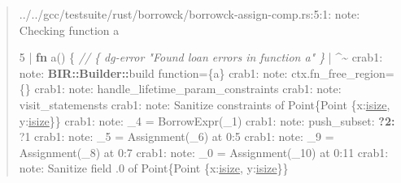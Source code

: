 \documentclass[
  11pt,
  twoside,symmetric]{report}
\newenvironment{Shaded}{}{}
\newcommand{\CharTok}[1]{#1}
\newcommand{\CommentTok}[1]{\textit{#1}}
\newcommand{\DataTypeTok}[1]{\underline{#1}}
\newcommand{\DecValTok}[1]{#1}
\newcommand{\ErrorTok}[1]{\textbf{#1}}
\newcommand{\KeywordTok}[1]{\textbf{#1}}
\newcommand{\NormalTok}[1]{#1}
\newcommand{\OperatorTok}[1]{#1}
\newcommand{\PreprocessorTok}[1]{\textbf{#1}}
\begin{document}
\begin{quote}
\begin{Shaded}
\begin{Highlighting}[]
\OperatorTok{../../}\NormalTok{gcc}\OperatorTok{/}\NormalTok{testsuite}\OperatorTok{/}\NormalTok{rust}\OperatorTok{/}\NormalTok{borrowck}\OperatorTok{/}\NormalTok{borrowck}\OperatorTok{{-}}\NormalTok{assign}\OperatorTok{{-}}\NormalTok{comp}\OperatorTok{.}\NormalTok{rs}\OperatorTok{:}\DecValTok{5}\OperatorTok{:}\DecValTok{1}\OperatorTok{:}\NormalTok{ note}\OperatorTok{:} 
\NormalTok{ Checking function a}

    \DecValTok{5} \OperatorTok{|} \KeywordTok{fn}\NormalTok{ a() }\OperatorTok{\{} \CommentTok{// \{ dg{-}error "Found loan errors in function a" \}}
      \OperatorTok{|} \OperatorTok{\^{}\textasciitilde{}}
\NormalTok{crab1}\OperatorTok{:}\NormalTok{ note}\OperatorTok{:} \PreprocessorTok{BIR::Builder::}\NormalTok{build function}\OperatorTok{=\{}\NormalTok{a}\OperatorTok{\}}
\NormalTok{crab1}\OperatorTok{:}\NormalTok{ note}\OperatorTok{:}\NormalTok{  ctx}\OperatorTok{.}\NormalTok{fn\_free\_region}\OperatorTok{=\{\}}
\NormalTok{crab1}\OperatorTok{:}\NormalTok{ note}\OperatorTok{:}\NormalTok{  handle\_lifetime\_param\_constraints}
\NormalTok{crab1}\OperatorTok{:}\NormalTok{ note}\OperatorTok{:}\NormalTok{ visit\_statemensts}
\NormalTok{crab1}\OperatorTok{:}\NormalTok{ note}\OperatorTok{:}\NormalTok{  Sanitize constraints of Point}\OperatorTok{\{}\NormalTok{Point }\OperatorTok{\{}\NormalTok{x}\OperatorTok{:}\DataTypeTok{isize}\OperatorTok{,}\NormalTok{ y}\OperatorTok{:}\DataTypeTok{isize}\OperatorTok{\}\}}
\NormalTok{crab1}\OperatorTok{:}\NormalTok{ note}\OperatorTok{:}\NormalTok{  \_4 }\OperatorTok{=}\NormalTok{ BorrowExpr(\_1)}
\NormalTok{crab1}\OperatorTok{:}\NormalTok{ note}\OperatorTok{:}\NormalTok{      push\_subset}\OperatorTok{:} \CharTok{\textquotesingle{}}\ErrorTok{?2: }\CharTok{\textquotesingle{}}\OperatorTok{?}\DecValTok{1}
\NormalTok{crab1}\OperatorTok{:}\NormalTok{ note}\OperatorTok{:}\NormalTok{  \_5 }\OperatorTok{=}\NormalTok{ Assignment(\_6) at }\DecValTok{0}\OperatorTok{:}\DecValTok{5}
\NormalTok{crab1}\OperatorTok{:}\NormalTok{ note}\OperatorTok{:}\NormalTok{  \_9 }\OperatorTok{=}\NormalTok{ Assignment(\_8) at }\DecValTok{0}\OperatorTok{:}\DecValTok{7}
\NormalTok{crab1}\OperatorTok{:}\NormalTok{ note}\OperatorTok{:}\NormalTok{  \_0 }\OperatorTok{=}\NormalTok{ Assignment(\_10) at }\DecValTok{0}\OperatorTok{:}\DecValTok{11}
\NormalTok{crab1}\OperatorTok{:}\NormalTok{ note}\OperatorTok{:}\NormalTok{  Sanitize field }\OperatorTok{.}\DecValTok{0}\NormalTok{ of Point}\OperatorTok{\{}\NormalTok{Point }\OperatorTok{\{}\NormalTok{x}\OperatorTok{:}\DataTypeTok{isize}\OperatorTok{,}\NormalTok{ y}\OperatorTok{:}\DataTypeTok{isize}\OperatorTok{\}\}}

\end{Highlighting}
\end{Shaded}
\end{quote}
\end{document}
